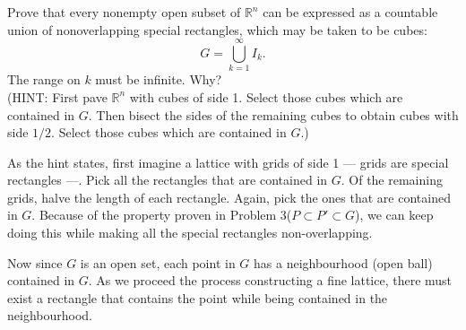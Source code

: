 \documentclass[answers]{exam}
\begin{document}
\begin{questions}
   \question
   Prove that every nonempty open subset of $\mathbb{R}^{n}$ can be expressed as a countable union of nonoverlapping special rectangles, which may be taken to be cubes:
   $$
      G = \bigcup_{k=1}^{\infty}I_{k}.
   $$
   The range on $k$ must be infinite. Why?\\
   (HINT: First pave $\mathbb{R}^{n}$ with cubes of side 1. Select those cubes which are contained in $G$. Then bisect the sides of the remaining cubes to obtain cubes with side $1/2$. Select those cubes which are contained in $G$.)
   \begin{solution}
      As the hint states, first imagine a lattice with grids of side 1 --- grids are special rectangles ---. Pick all the rectangles that are contained in $G$. Of the remaining grids, halve the length of each rectangle. Again, pick the ones that are contained in $G$. Because of the property proven in Problem 3($P \subset P' \subset G$), we can keep doing this while making all the special rectangles non-overlapping.\par
      Now since $G$ is an open set, each point in $G$ has a neighbourhood (open ball) contained in $G$. As we proceed the process constructing a fine lattice, there must exist a rectangle that contains the point while being contained in the neighbourhood. 
   \end{solution}
   

\end{questions}
\end{document}
